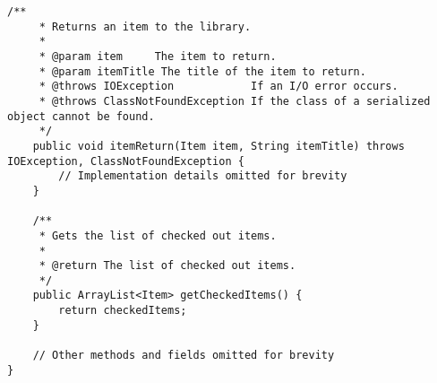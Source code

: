 \documentclass{article}
\begin{document}
\begin{lstlisting}[caption={LibraryClient.java}]
    /**
     * Returns an item to the library.
     *
     * @param item     The item to return.
     * @param itemTitle The title of the item to return.
     * @throws IOException            If an I/O error occurs.
     * @throws ClassNotFoundException If the class of a serialized object cannot be found.
     */
    public void itemReturn(Item item, String itemTitle) throws IOException, ClassNotFoundException {
        // Implementation details omitted for brevity
    }

    /**
     * Gets the list of checked out items.
     *
     * @return The list of checked out items.
     */
    public ArrayList<Item> getCheckedItems() {
        return checkedItems;
    }

    // Other methods and fields omitted for brevity
}
\end{lstlisting}
\end{document}
